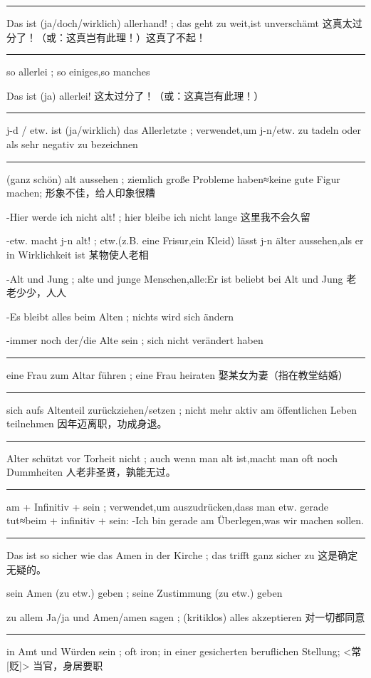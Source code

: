 \noindent\rule{\textwidth}{1pt}  
Das ist (ja/doch/wirklich) allerhand! ; das geht zu weit,ist unverschämt 
这真太过分了！（或：这真岂有此理！）这真了不起！

\noindent\rule{\textwidth}{1pt}  
so allerlei ; so einiges,so manches

Das ist (ja) allerlei!
这太过分了！（或：这真岂有此理！）

\noindent\rule{\textwidth}{1pt}  
j-d / etw. ist (ja/wirklich) das Allerletzte ; verwendet,um j-n/etw. zu tadeln oder als sehr negativ zu bezeichnen

\noindent\rule{\textwidth}{1pt}  
(ganz schön) alt aussehen ; ziemlich große Probleme haben≈keine gute Figur machen;
形象不佳，给人印象很糟

-Hier werde ich nicht alt! ; hier bleibe ich nicht lange
这里我不会久留

-etw. macht j-n alt! ; etw.(z.B. eine Frisur,ein Kleid) lässt j-n älter aussehen,als er in Wirklichkeit ist
某物使人老相

-Alt und Jung ; alte und junge Menschen,alle:Er ist beliebt bei Alt und Jung 
老老少少，人人

-Es bleibt alles beim Alten ; nichts wird sich ändern

-immer noch der/die Alte sein ; sich nicht verändert haben

\noindent\rule{\textwidth}{1pt}  
eine Frau zum Altar führen ; eine Frau heiraten
娶某女为妻（指在教堂结婚）

\noindent\rule{\textwidth}{1pt}  
sich aufs Altenteil zurückziehen/setzen ; nicht mehr aktiv am öffentlichen Leben teilnehmen
因年迈离职，功成身退。

\noindent\rule{\textwidth}{1pt}  
Alter schützt vor Torheit nicht ; auch wenn man alt ist,macht man oft noch Dummheiten
人老非圣贤，孰能无过。

\noindent\rule{\textwidth}{1pt}  
am + Infinitiv + sein ; verwendet,um auszudrücken,dass man etw. gerade tut≈beim + infinitiv + sein: 
-Ich bin gerade am Überlegen,was wir machen sollen.

\noindent\rule{\textwidth}{1pt}  
Das ist so sicher wie das Amen in der Kirche ; das trifft ganz sicher zu
这是确定无疑的。

sein Amen (zu etw.) geben ; seine Zustimmung (zu etw.) geben

zu allem Ja/ja und Amen/amen sagen ; (kritiklos) alles akzeptieren
对一切都同意

\noindent\rule{\textwidth}{1pt}  
in Amt und Würden sein ; oft iron; in einer gesicherten beruflichen Stellung;
<常[贬]> 当官，身居要职

